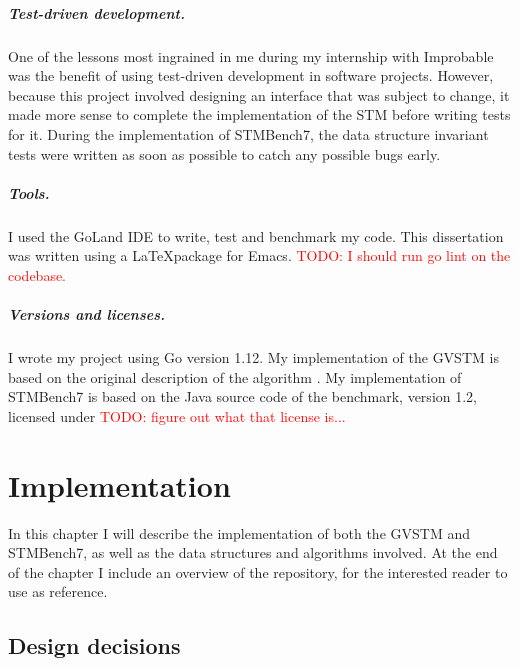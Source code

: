 \documentclass[12pt,a4paper,oneside,openright]{report}
\newcommand{\todo}[1]{\textcolor{red}{TODO: #1}}
\begin{document}
\paragraph{Test-driven development.} One of the lessons most ingrained
in me during my internship with Improbable was the benefit of using
test-driven development in software projects. However, because this
project involved designing an interface that was subject to change, it
made more sense to complete the implementation of the STM before
writing tests for it. During the implementation of STMBench7, the data
structure invariant tests were written as soon as possible to catch
any possible bugs early.

\paragraph{Tools.} I used the GoLand IDE to write, test and benchmark
my code. This dissertation was written using a \LaTeX package for
Emacs.  \todo{I should run go lint on the codebase.}

\paragraph{Versions and licenses.} I wrote my project using Go version
1.12. My implementation of the GVSTM is based on the original
description of the algorithm \cite{cachopo2007phd}. My implementation
of STMBench7 is based on the Java source code of the benchmark,
version 1.2, licensed under \todo{figure out what that license is...}




\chapter{Implementation}

In this chapter I will describe the implementation of both the GVSTM
and STMBench7, as well as the data structures and algorithms
involved. At the end of the chapter I include an overview of the
repository, for the interested reader to use as reference.

\section{Design decisions}
\label{sec:design-decisions}
\end{document}
